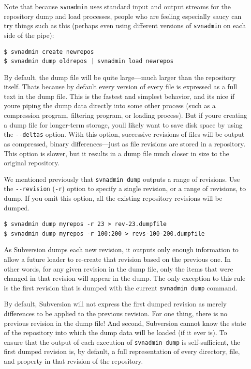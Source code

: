 Note that because \texttt{svnadmin} uses standard input and output
streams for the repository dump and load processes, people who are
feeling especially saucy can try things such as this (perhaps even using
different versions of \texttt{svnadmin} on each side of the pipe):

\begin{verbatim}
$ svnadmin create newrepos
$ svnadmin dump oldrepos | svnadmin load newrepos
\end{verbatim}

By default, the dump file will be quite large---much larger than the
repository itself. That\textquotesingle s because by default every
version of every file is expressed as a full text in the dump file. This
is the fastest and simplest behavior, and it\textquotesingle s nice if
you\textquotesingle re piping the dump data directly into some other
process (such as a compression program, filtering program, or loading
process). But if you\textquotesingle re creating a dump file for
longer-term storage, you\textquotesingle ll likely want to save disk
space by using the \texttt{-\/-deltas} option. With this option,
successive revisions of files will be output as compressed, binary
differences---just as file revisions are stored in a repository. This
option is slower, but it results in a dump file much closer in size to
the original repository.

We mentioned previously that \texttt{svnadmin\ dump} outputs a range of
revisions. Use the \texttt{-\/-revision} (\texttt{-r}) option to specify
a single revision, or a range of revisions, to dump. If you omit this
option, all the existing repository revisions will be dumped.

\begin{verbatim}
$ svnadmin dump myrepos -r 23 > rev-23.dumpfile
$ svnadmin dump myrepos -r 100:200 > revs-100-200.dumpfile
\end{verbatim}

As Subversion dumps each new revision, it outputs only enough
information to allow a future loader to re-create that revision based on
the previous one. In other words, for any given revision in the dump
file, only the items that were changed in that revision will appear in
the dump. The only exception to this rule is the first revision that is
dumped with the current \texttt{svnadmin\ dump} command.

By default, Subversion will not express the first dumped revision as
merely differences to be applied to the previous revision. For one
thing, there is no previous revision in the dump file! And second,
Subversion cannot know the state of the repository into which the dump
data will be loaded (if it ever is). To ensure that the output of each
execution of \texttt{svnadmin\ dump} is self-sufficient, the first
dumped revision is, by default, a full representation of every
directory, file, and property in that revision of the repository.

